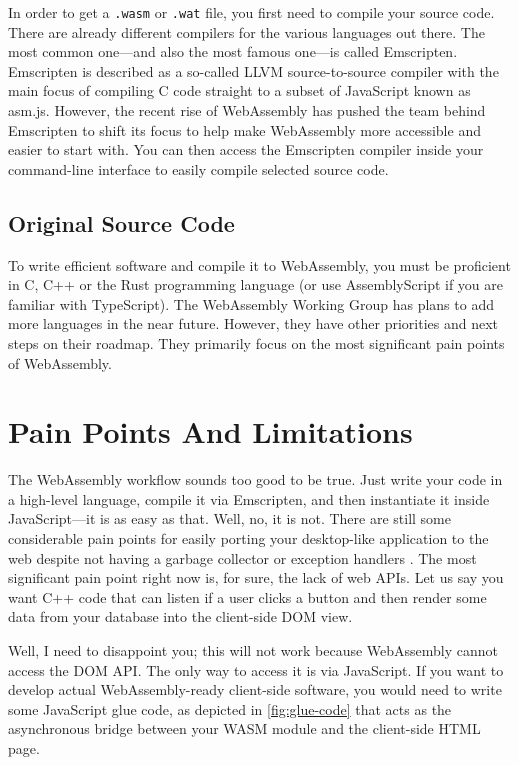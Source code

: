 \documentclass[10pt]{article}
\begin{document}
\begin{sloppypar}
  In order to get a \lstinline{.wasm} or \lstinline{.wat} file, you first need to compile your source code. There are already different compilers for the various languages out there. The most common one—and also the most famous one—is called Emscripten. Emscripten is described as a so-called LLVM source-to-source compiler with the main focus of compiling C code straight to a subset of JavaScript known as asm.js. However, the recent rise of WebAssembly has pushed the team behind Emscripten to shift its focus to help make WebAssembly more accessible and easier to start with. You can then access the Emscripten compiler inside your command-line interface to easily compile selected source code.

  \subsection{Original Source Code}
  \label{sec:original-source-code}

  To write efficient software and compile it to WebAssembly, you must be proficient in C, C++ or the Rust programming language (or use AssemblyScript if you are familiar with TypeScript). The WebAssembly Working Group has plans to add more languages in the near future. However, they have other priorities and next steps on their roadmap. They primarily focus on the most significant pain points of WebAssembly.

  \section{Pain Points And Limitations}
  \label{sec:pain-points-and-limitations}

  The WebAssembly workflow sounds too good to be true. Just write your code in a high-level language, compile it via Emscripten, and then instantiate it inside JavaScript—it is as easy as that. Well, no, it is not. There are still some considerable pain points for easily porting your desktop-like application to the web despite not having a garbage collector or exception handlers \citep{w3c_roadmap_2019}. The most significant pain point right now is, for sure, the lack of web APIs. Let us say you want C++ code that can listen if a user clicks a button and then render some data from your database into the client-side DOM view.

  Well, I need to disappoint you; this will not work because WebAssembly cannot access the DOM API. The only way to access it is via JavaScript. If you want to develop actual WebAssembly-ready client-side software, you would need to write some JavaScript glue code, as depicted in \autoref{fig:glue-code} \citep{mihaylov_how_2018} that acts as the asynchronous bridge between your WASM module and the client-side HTML page.


\end{sloppypar}
\end{document}
